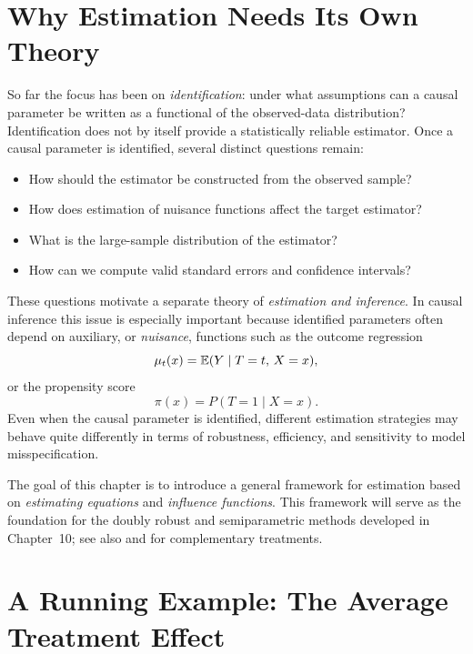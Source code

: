\documentclass[master.tex]{subfiles}
\begin{document}
\section{Why Estimation Needs Its Own Theory}
\label{w9:sec:motivation}

So far the focus has been on \emph{identification}: under what
assumptions can a causal parameter be written as a functional of the
observed-data distribution?  Identification does not by itself provide
a statistically reliable estimator.  Once a causal parameter is
identified, several distinct questions remain:
\begin{itemize}
  \item How should the estimator be constructed from the observed sample?
  \item How does estimation of nuisance functions affect the target
    estimator?
  \item What is the large-sample distribution of the estimator?
  \item How can we compute valid standard errors and confidence intervals?
\end{itemize}

These questions motivate a separate theory of \emph{estimation and
inference}.  In causal inference this issue is especially important
because identified parameters often depend on auxiliary, or
\emph{nuisance}, functions such as the outcome regression
\[
  \mu_t(x) = \mathbb{E}(Y \mid T=t,\, X=x),
\]
or the propensity score
\[
  \pi(x) = P(T=1 \mid X=x).
\]
Even when the causal parameter is identified, different estimation
strategies may behave quite differently in terms of robustness,
efficiency, and sensitivity to model misspecification.

The goal of this chapter is to introduce a general framework for
estimation based on \emph{estimating equations} and \emph{influence
functions}.  This framework will serve as the foundation for the doubly
robust and semiparametric methods developed in Chapter~10; see also
\citet{imbens2015causal} and \citet{hernan2020causal} for complementary
treatments.

\section{A Running Example: The Average Treatment Effect}
\label{w9:sec:ate}
\end{document}
